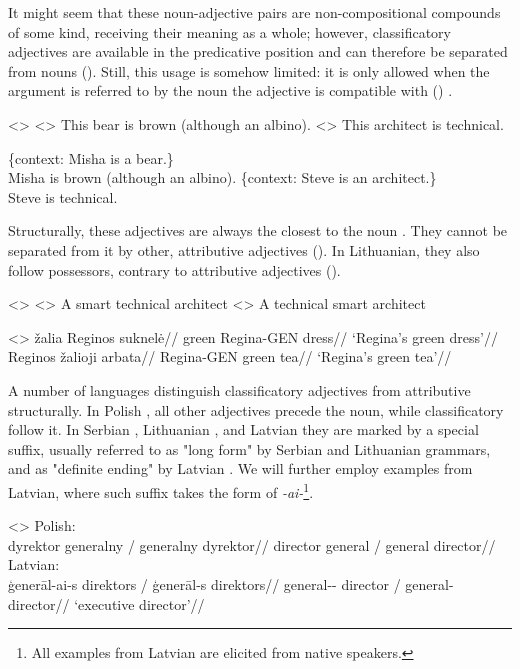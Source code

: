 \documentclass[a4paper, 12pt]{article}
\begin{document}
It might seem that these noun-adjective pairs are non-compositional compounds of some kind, receiving their meaning as a whole; however, classificatory adjectives are available in the predicative position and can therefore be separated from nouns (\nextx). Still, this usage is somehow limited: it is only allowed when the argument is referred to by the noun the adjective is compatible with (\anextx) \parencite[cf.][a.m.o.]{levi1978syntaxsemanticscomplex}.

\pex<>
    \a<> This bear is brown (although an albino).
    \a<> This architect is technical.
\xe

\pex
    \a \{context: Misha is a bear.\}\\ \ljudge{\textsuperscript{\#}}Misha is brown (although an albino).
    \a \{context: Steve is an architect.\}\\ \ljudge*Steve is technical.
\xe

Structurally, these adjectives are always the closest to the noun \parencite{rutkowski2006classifyingadjectivesnoun}. They cannot be separated from it by other, attributive adjectives (\nextx). In Lithuanian, they also follow possessors, contrary to attributive adjectives (\anextx).

\pex<>
    \a<> A smart technical architect
    \a<> \ljudge{*}A technical smart architect
\xe

\pex<>
    \a \begingl
        \gla žalia Reginos suknelė//
        \glb green Regina-GEN dress//
        \glft `Regina’s green dress’//
    \endgl
    \a \begingl
        \gla Reginos žalioji arbata//
        \glb Regina-GEN green tea//
        \glft `Regina’s green tea’//
    \endgl
\xe

A number of languages distinguish classificatory adjectives from attributive structurally. In Polish \parencite{rutkowski2005classificationprojectionpolish}, all other adjectives precede the noun, while classificatory follow it. In Serbian \parencite{rutkowski2005classificationprojectionpolish}, Lithuanian \parencite{rutkowski2006classifyingadjectivesnoun,holvoet2012semanticmapdefinite}, and Latvian \parencite{holvoet2012semanticmapdefinite} they are marked by a special suffix, usually referred to as "long form" by Serbian and Lithuanian grammars, and as "definite ending" by Latvian \parencite{kalnaca2021latviangrammar}. We will further employ examples from Latvian, where such suffix takes the form of \textit{-ai-}\footnote{All examples from Latvian are elicited from native speakers.}.

\pex<>
    \a Polish:\\
    \begingl
        \gla dyrektor generalny / generalny dyrektor//
        \glb director general / \ljudge*general director//
    \endgl
    \a Latvian:\\
    \begingl
        \gla ģenerāl-ai-s direktors / \ljudge*ģenerāl-s direktors//
        \glb general-\Def{}-\Nom{} director / general-\Nom{} director//
        \glft `executive director'//
    \endgl
\xe
\end{document}
